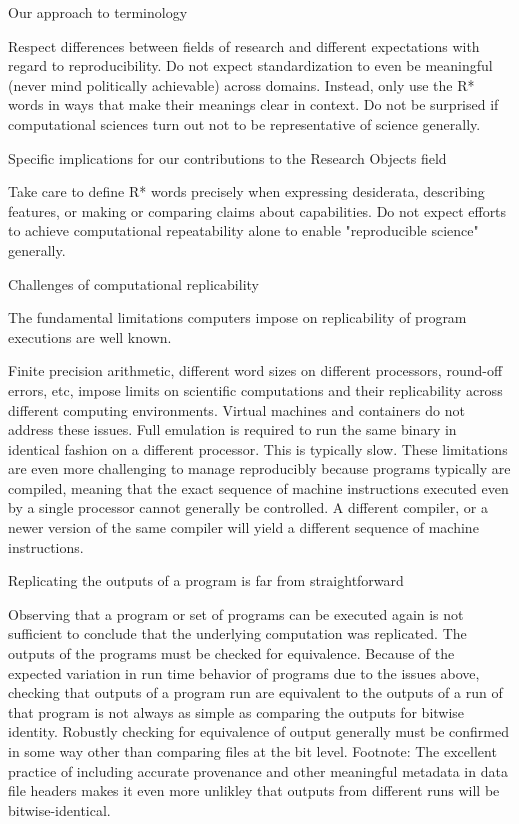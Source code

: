 		Our approach to terminology

			Respect differences between fields of research and different expectations with regard to reproducibility.
			Do not expect standardization to even be meaningful (never mind politically achievable) across domains.
			Instead, only use the R* words in ways that make their meanings clear in context.
			Do not be surprised if computational sciences turn out not to be representative of science generally.

		Specific implications for our contributions to the Research Objects field

			Take care to define R* words precisely when expressing desiderata, describing features, or making or comparing claims about capabilities. 
			Do not expect efforts to achieve computational repeatability alone to enable "reproducible science" generally.

	Challenges of computational replicability
	
		The fundamental limitations computers impose on replicability of program executions are well known.
	
			Finite precision arithmetic, different word sizes on different processors, round-off errors, etc, impose limits on scientific computations and 
				their replicability across different computing environments.
			Virtual machines and containers do not address these issues. Full emulation is required to run the same binary in identical fashion
				on a different processor.  This is typically slow.
			These limitations are even more challenging to manage reproducibly because programs typically are compiled, meaning that the
				exact sequence of machine instructions executed even by a single processor cannot generally be controlled.  A different compiler,
				or a newer version of the same compiler will yield a different sequence of machine instructions.

		Replicating the outputs of a program is far from straightforward

			Observing that a program or set of programs can be executed again is not sufficient to conclude that the underlying computation
				was replicated.  The outputs of the programs must be checked for equivalence.
			Because of the expected variation in run time behavior of programs due to the issues above, checking that outputs of a program
				run are equivalent to the outputs of a run of that program is not always as simple as 
				comparing the outputs for bitwise identity.
			Robustly checking for equivalence of output generally must be confirmed in some way other than comparing files at the bit level.
			Footnote: The excellent practice of including accurate provenance and other meaningful metadata in data file headers makes it 
				even more unlikley that outputs from different runs will be bitwise-identical.
	
